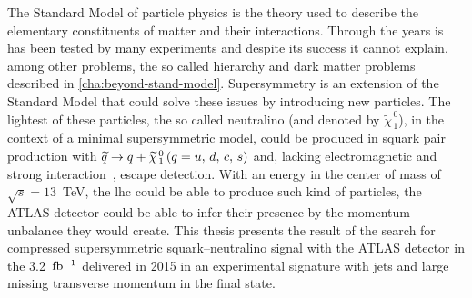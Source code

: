 The Standard Model of particle physics is the theory used to describe the
elementary constituents of matter and their interactions. Through the years is
has been tested by many experiments and despite its success it cannot explain,
among other problems, the so called hierarchy and dark matter problems described
in \cref{cha:beyond-stand-model}. Supersymmetry is an extension of the Standard
Model that could solve these issues by introducing new particles. The lightest
of these particles, the so called neutralino (and denoted by
$\widetilde{\chi}_{\, 1}^{\, 0}$), in the context of a minimal supersymmetric
model, could be produced in squark pair production with $\widetilde{q} \rightarrow q + \widetilde{\chi}_{\, 1}^{\, 0}\, (q = u,\, d,\, c,\, s)$ and,
lacking electromagnetic and strong interaction~\cite{MSSMIntro}, escape
detection. With an energy in the center of mass of $\sqrt{s} = 13$~TeV, the
\gls{lhc} could be able to produce such kind of particles, the ATLAS detector
could be able to infer their presence by the momentum unbalance they would
create. This thesis presents the result of the search for compressed
supersymmetric squark--neutralino signal with the ATLAS detector in the
3.2~$\mbox{fb$^{-1}$}$ delivered in 2015 in an experimental signature with jets and large
missing transverse momentum in the final state.
